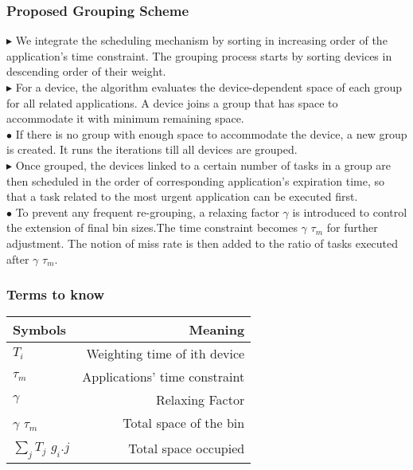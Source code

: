 \documentclass{beamer}
\begin{document}
\begin{frame}
\frametitle{Proposed Grouping Scheme}
$\blacktriangleright$ We integrate the scheduling mechanism by sorting in increasing order of the application’s time constraint. The grouping process starts by sorting devices in descending order
of their weight.\\
$\blacktriangleright$ For a device, the algorithm evaluates the device-dependent space of each group for all related applications. A device joins a group that has space to accommodate it with minimum remaining space.\\
$\bullet$ If there is no group with enough space to accommodate the device, a new group is created. It runs the iterations till all devices are grouped.\\
$\blacktriangleright$ Once grouped, the devices linked to a certain number of tasks in a group are then scheduled in the order of corresponding application’s expiration time, so that a task related to the most urgent application can be executed first.\\
$\bullet$ To prevent any frequent re-grouping, a relaxing factor $\gamma$ is introduced to control the extension of final bin sizes.The time constraint becomes $\gamma$ \times $\tau_m$ for further adjustment. The notion of miss rate is then added to the ratio of tasks executed after $\gamma$ \times $\tau_m$.


\end{frame}


\begin{frame}
\frametitle{Terms to know}
\begin{table}[h!]
  \begin{center}
    \begin{tabular}{|l|r|}
    \hline 
    Symbols & Meaning\\
    \hline
    \hline
    $T_i$ & Weighting time of ith device\\
    \hline
    $\tau_m$ & Applications' time constraint\\
    \hline
	$\gamma$ & Relaxing Factor\\
	\hline
	$\gamma$ \times $\tau_m$ & Total space of the bin\\
	\hline
	$\sum_j T_j$ \times $g_i.j$ & Total space occupied\\
	\hline
    \end{tabular}
  \end{center}
\label{Table:1}
\end{table}

\end{frame}
\end{document}
